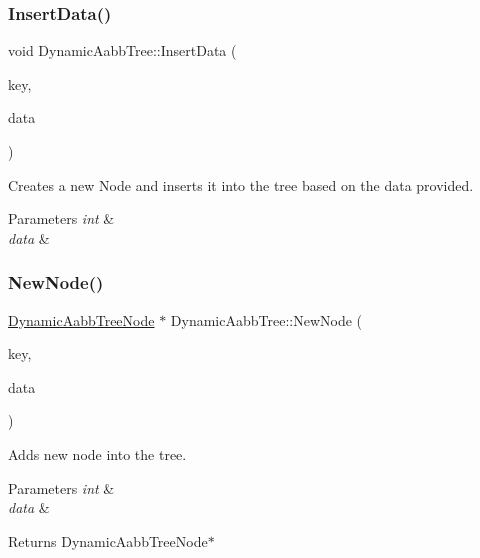 \subsubsection{\texorpdfstring{Insert\+Data()}{InsertData()}}
{\footnotesize\ttfamily void Dynamic\+Aabb\+Tree\+::\+Insert\+Data (\begin{DoxyParamCaption}\item[{unsigned int \&}]{key,  }\item[{const \hyperlink{classSpatialPartitionData}{Spatial\+Partition\+Data} \&}]{data }\end{DoxyParamCaption})}



Creates a new Node and inserts it into the tree based on the data provided. 


\begin{DoxyParams}{Parameters}
{\em int} & \\
\hline
{\em data} & \\
\hline
\end{DoxyParams}
\mbox{\label{classDynamicAabbTree_a32d608fc624edf024e369a7ac334d1e7}} 
\subsubsection{\texorpdfstring{New\+Node()}{NewNode()}}
{\footnotesize\ttfamily \hyperlink{classDynamicAabbTreeNode}{Dynamic\+Aabb\+Tree\+Node} $\ast$ Dynamic\+Aabb\+Tree\+::\+New\+Node (\begin{DoxyParamCaption}\item[{unsigned int \&}]{key,  }\item[{const \hyperlink{classSpatialPartitionData}{Spatial\+Partition\+Data} \&}]{data }\end{DoxyParamCaption})}



Adds new node into the tree. 


\begin{DoxyParams}{Parameters}
{\em int} & \\
\hline
{\em data} & \\
\hline
\end{DoxyParams}
\begin{DoxyReturn}{Returns}
Dynamic\+Aabb\+Tree\+Node$\ast$ 
\end{DoxyReturn}
\mbox{\label{classDynamicAabbTree_a57bb2fa78ba6a3932f125be5e06200db}} 
